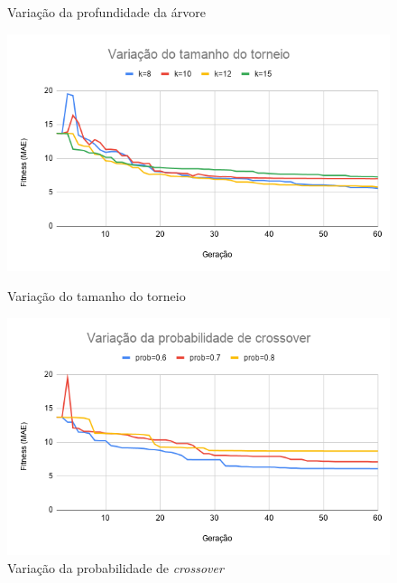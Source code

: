 \documentclass[a4paper]{paper}
\begin{document}
\begin{figure}[h!]
\begin{minipage}{0.5\textwidth}
    \caption{Variação da profundidade da árvore}
    \label{fig:var_d}
  \end{minipage}
  \begin{minipage}{0.5\textwidth}
    \includegraphics[width=\textwidth]{var_k}
    \caption{Variação do tamanho do torneio}
    \label{fig:var_k}
  \end{minipage}
  \begin{minipage}{0.5\textwidth}
    \includegraphics[width=\textwidth]{var_pc}
    \caption{Variação da probabilidade de \textit{crossover}}
    \label{fig:var_pc}
  \end{minipage}
\end{figure}
\end{document}
